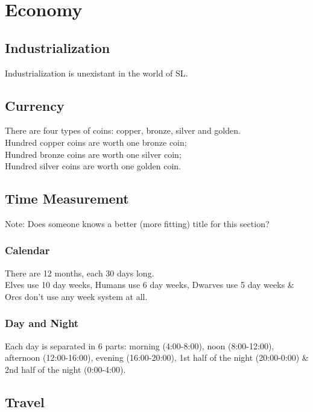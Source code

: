 \documentclass[a4paper]{report}
\begin{document}
	\chapter{Economy}

		\section{Industrialization}

			Industrialization is unexistant in the world of SL.

		\section{Currency}

			There are four types of coins: copper, bronze, silver and golden. \\
			Hundred copper coins are worth one bronze coin; \\
			Hundred bronze coins are worth one silver coin; \\
			Hundred silver coins are worth one golden coin. \\

		\section{Time Measurement}

			Note: Does someone knows a better (more fitting) title for this section?

			\subsection{Calendar}

				There are 12 months, each 30 days long. \\
				Elves use 10 day weeks, Humans use 6 day weeks, Dwarves use 5 day weeks \& Orcs don't use any week system at all.

			\subsection{Day and Night}

				Each day is separated in 6 parts: morning (4:00-8:00), noon (8:00-12:00), afternoon (12:00-16:00), evening (16:00-20:00), 1st half of the night (20:00-0:00) \& 2nd half of the night (0:00-4:00).

		\section{Travel}
\end{document}
